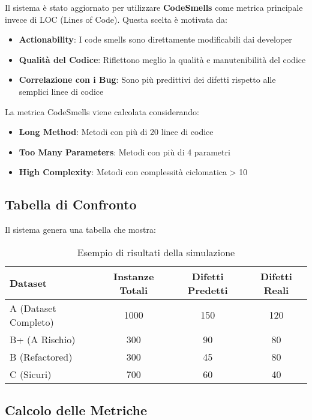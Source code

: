 \documentclass[12pt,a4paper]{article}
\begin{document}
Il sistema è stato aggiornato per utilizzare \textbf{CodeSmells} come metrica principale invece di LOC (Lines of Code). Questa scelta è motivata da:

\begin{itemize}
    \item \textbf{Actionability}: I code smells sono direttamente modificabili dai developer
    \item \textbf{Qualità del Codice}: Riflettono meglio la qualità e manutenibilità del codice
    \item \textbf{Correlazione con i Bug}: Sono più predittivi dei difetti rispetto alle semplici linee di codice
\end{itemize}

La metrica CodeSmells viene calcolata considerando:
\begin{itemize}
    \item \textbf{Long Method}: Metodi con più di 20 linee di codice
    \item \textbf{Too Many Parameters}: Metodi con più di 4 parametri
    \item \textbf{High Complexity}: Metodi con complessità ciclomatica > 10
\end{itemize}

\subsection{Tabella di Confronto}

Il sistema genera una tabella che mostra:

\begin{table}[H]
\centering
\begin{tabular}{@{}lccc@{}}
\toprule
\textbf{Dataset} & \textbf{Instanze Totali} & \textbf{Difetti Predetti} & \textbf{Difetti Reali} \\
\midrule
A (Dataset Completo) & 1000 & 150 & 120 \\
B+ (A Rischio) & 300 & 90 & 80 \\
B (Refactored) & 300 & 45 & 80 \\
C (Sicuri) & 700 & 60 & 40 \\
\bottomrule
\end{tabular}
\caption{Esempio di risultati della simulazione}
\end{table}

\subsection{Calcolo delle Metriche}
\end{document}
